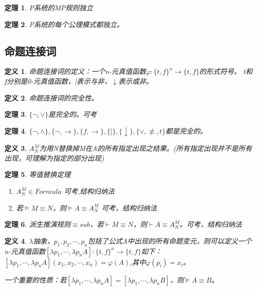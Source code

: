 \documentclass[a4paper]{ctexart}
\newtheorem{thm}{\hspace{2em}定理}[subsection]
\newtheorem{defi}{\hspace{2em}定义}[subsection]
\newcommand{\shade}[1]{\colorbox{shadecolor}{#1}}
\begin{document}
\begin{thm}
  P系统的MP规则独立
\end{thm}
\begin{thm}
  P系统的每个公理模式都独立。
\end{thm}

\subsection{命题连接词}
\begin{defi}
  命题连接词的定义：一个n-元真值函数$\varphi:\{t,f\}^n\rightarrow\{t,f\}$的形式符号。
  t和f分别是0-元真值函数，|表示与非，$\downarrow$表示或非。
\end{defi}

\begin{defi}
  命题连接词的完全性。
\end{defi}

\begin{thm}
  $\{\neg,\vee\}$是完全的。\shade{可考}
\end{thm}

\begin{thm}
  $\{\neg,\wedge\},\{\neg,\rightarrow\},\{f,\rightarrow\},\{|\},\{\downarrow\},\{\vee,\not\equiv,t\}$都是完全的。
\end{thm}

\begin{defi}
  $A_N^M$为用N替换掉M在A的所有指定出现之结果。(所有指定出现并不是所有出现，可理解为指定的部分出现)
\end{defi}

\begin{thm}
  等值替换定理
  \begin{enumerate}[itemindent=2em]
    \item $A_N^M\in Formula$ \shade{可考,结构归纳法}
    \item 若$\models M\equiv N$，则$\models A\equiv A_N^M$ \shade{可考，结构归纳法}
  \end{enumerate}
\end{thm}

\begin{thm}
  派生推演规则$\equiv sub$，若$\vdash M\equiv N$，则$\vdash A\equiv A_N^M$。\shade{可考，结构归纳法}
\end{thm}

\begin{defi}
  $\lambda$抽象，$p_1,p_2,\cdots,p_n$包括了公式A中出现的所有命题变元，则可以定义一个n-元真值函数$[\lambda p_1,\cdots,\lambda p_nA]:\{t,f\}^n\rightarrow\{t,f\}$如下：$[\lambda p_1,\cdots,\lambda p_nA](x_1,x_2,\cdots,x_n)=\varphi(A)$,其中$\varphi(p_i)=x_i$。
  
  一个重要的性质：若$[\lambda p_1,\cdots,\lambda p_nA]=[\lambda p_1,\cdots,\lambda p_nB]$，则$\models A\equiv B$。
\end{defi}
\end{document}
